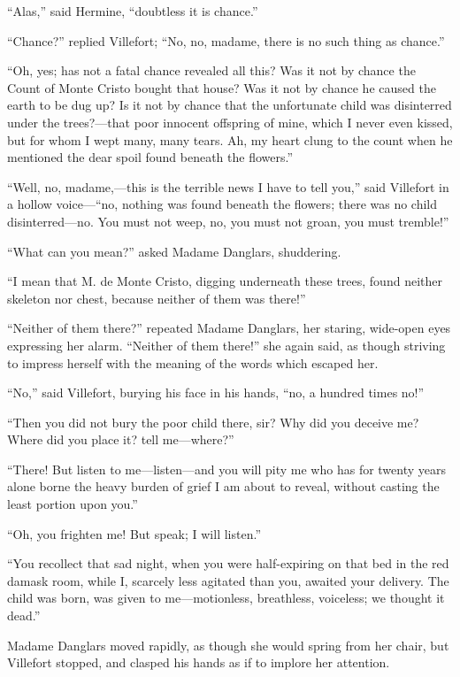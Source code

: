“Alas,” said Hermine, “doubtless it is chance.”

“Chance?” replied Villefort; “No, no, madame, there is no such thing as
chance.”

“Oh, yes; has not a fatal chance revealed all this? Was it not by
chance the Count of Monte Cristo bought that house? Was it not by
chance he caused the earth to be dug up? Is it not by chance that the
unfortunate child was disinterred under the trees?—that poor innocent
offspring of mine, which I never even kissed, but for whom I wept many,
many tears. Ah, my heart clung to the count when he mentioned the dear
spoil found beneath the flowers.”

“Well, no, madame,—this is the terrible news I have to tell you,” said
Villefort in a hollow voice—“no, nothing was found beneath the flowers;
there was no child disinterred—no. You must not weep, no, you must not
groan, you must tremble!”

“What can you mean?” asked Madame Danglars, shuddering.

“I mean that M. de Monte Cristo, digging underneath these trees, found
neither skeleton nor chest, because neither of them was there!”

“Neither of them there?” repeated Madame Danglars, her staring,
wide-open eyes expressing her alarm. “Neither of them there!” she again
said, as though striving to impress herself with the meaning of the
words which escaped her.

“No,” said Villefort, burying his face in his hands, “no, a hundred
times no!”

“Then you did not bury the poor child there, sir? Why did you deceive
me? Where did you place it? tell me—where?”

“There! But listen to me—listen—and you will pity me who has for twenty
years alone borne the heavy burden of grief I am about to reveal,
without casting the least portion upon you.”

“Oh, you frighten me! But speak; I will listen.”

“You recollect that sad night, when you were half-expiring on that bed
in the red damask room, while I, scarcely less agitated than you,
awaited your delivery. The child was born, was given to me—motionless,
breathless, voiceless; we thought it dead.”

Madame Danglars moved rapidly, as though she would spring from her
chair, but Villefort stopped, and clasped his hands as if to implore
her attention.


